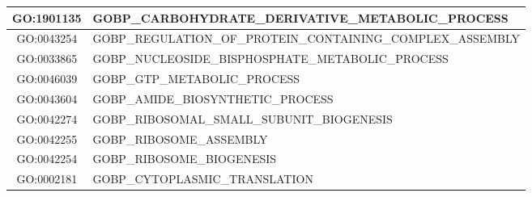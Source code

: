 \begin{table}[t]
\begin{tabular}{|c|m{13cm}|}
        GO:1901135 & GOBP\_CARBOHYDRATE\_DERIVATIVE\_METABOLIC\_PROCESS \\ \hline
        GO:0043254 & GOBP\_REGULATION\_OF\_PROTEIN\_CONTAINING\_\newline COMPLEX\_ASSEMBLY \\ \hline
        GO:0033865 & GOBP\_NUCLEOSIDE\_BISPHOSPHATE\_METABOLIC\_PROCESS \\ \hline
        GO:0046039 & GOBP\_GTP\_METABOLIC\_PROCESS \\ \hline
        GO:0043604 & GOBP\_AMIDE\_BIOSYNTHETIC\_PROCESS \\ \hline
        GO:0042274 & GOBP\_RIBOSOMAL\_SMALL\_SUBUNIT\_BIOGENESIS \\ \hline
        GO:0042255 & GOBP\_RIBOSOME\_ASSEMBLY \\ \hline
        GO:0042254 & GOBP\_RIBOSOME\_BIOGENESIS \\ \hline
        GO:0002181 & GOBP\_CYTOPLASMIC\_TRANSLATION \\ \hline
    \end{tabular}
\end{table}